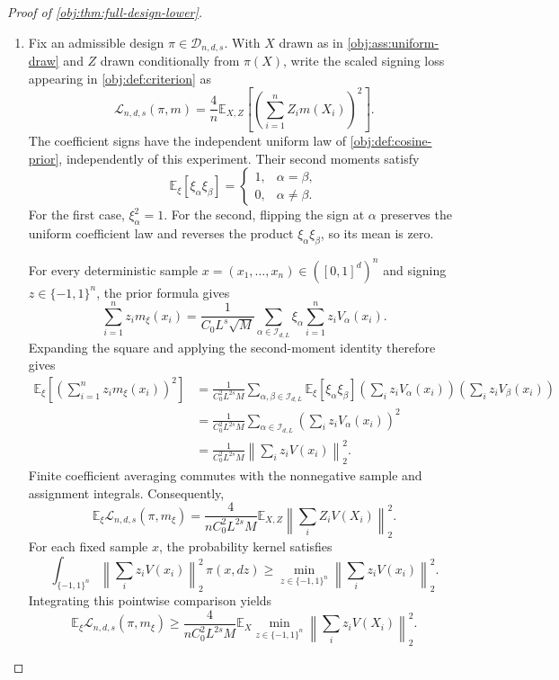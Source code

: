\documentclass[11pt]{article}
\begin{document}
\begin{proof}[Proof of \cref{obj:thm:full-design-lower}]
\begin{enumerate}
\item
Fix an admissible design \(\pi\in\mathcal D_{n,d,s}\). With \(X\) drawn as in
\cref{obj:ass:uniform-draw} and \(Z\) drawn conditionally from \(\pi(X)\), write the scaled signing loss appearing in \cref{obj:def:criterion} as
\[
\mathcal L_{n,d,s}(\pi,m)
=\frac4n\mathbb E_{X,Z}
 \left[\left(\sum_{i=1}^n Z_i m(X_i)\right)^2\right].
\]
The coefficient signs have the independent uniform law of
\cref{obj:def:cosine-prior}, independently of this experiment. Their second moments satisfy
\[
\mathbb E_\xi[\xi_\alpha\xi_\beta]
=
\begin{cases}
1,&\alpha=\beta,\\
0,&\alpha\ne\beta.
\end{cases}
\]
For the first case, \(\xi_\alpha^2=1\). For the second, flipping the sign at
\(\alpha\) preserves the uniform coefficient law and reverses the product
\(\xi_\alpha\xi_\beta\), so its mean is zero.

For every deterministic sample
\(x=(x_1,\ldots,x_n)\in([0,1]^d)^n\) and signing
\(z\in\{-1,1\}^n\), the prior formula gives
\[
\sum_{i=1}^n z_i m_\xi(x_i)
=\frac{1}{C_0L^s\sqrt M}
 \sum_{\alpha\in\mathcal I_{d,L}}
 \xi_\alpha\sum_{i=1}^n z_iV_\alpha(x_i).
\]
Expanding the square and applying the second-moment identity therefore gives
\[
\begin{aligned}
\mathbb E_\xi
 \left[\left(\sum_{i=1}^n z_i m_\xi(x_i)\right)^2\right]
&=\frac{1}{C_0^2L^{2s}M}
 \sum_{\alpha,\beta\in\mathcal I_{d,L}}
 \mathbb E_\xi[\xi_\alpha\xi_\beta]
 \left(\sum_i z_iV_\alpha(x_i)\right)
 \left(\sum_i z_iV_\beta(x_i)\right)\\
&=\frac{1}{C_0^2L^{2s}M}
 \sum_{\alpha\in\mathcal I_{d,L}}
 \left(\sum_i z_iV_\alpha(x_i)\right)^2\\
&=\frac{1}{C_0^2L^{2s}M}
 \left\|\sum_i z_iV(x_i)\right\|_2^2.
\end{aligned}
\]
Finite coefficient averaging commutes with the nonnegative sample and assignment integrals. Consequently,
\[
\mathbb E_\xi\mathcal L_{n,d,s}(\pi,m_\xi)
=\frac{4}{nC_0^2L^{2s}M}
 \mathbb E_{X,Z}
 \left\|\sum_i Z_iV(X_i)\right\|_2^2.
\]
For each fixed sample \(x\), the probability kernel satisfies
\[
\int_{\{-1,1\}^n}
 \left\|\sum_i z_iV(x_i)\right\|_2^2\,\pi(x,dz)
\geq
\min_{z\in\{-1,1\}^n}
 \left\|\sum_i z_iV(x_i)\right\|_2^2.
\]
Integrating this pointwise comparison yields
\[
\mathbb E_\xi\mathcal L_{n,d,s}(\pi,m_\xi)
\geq
\frac{4}{nC_0^2L^{2s}M}
\mathbb E_X
 \min_{z\in\{-1,1\}^n}
 \left\|\sum_i z_iV(X_i)\right\|_2^2.
\]


\end{enumerate}
\end{proof}
\end{document}

